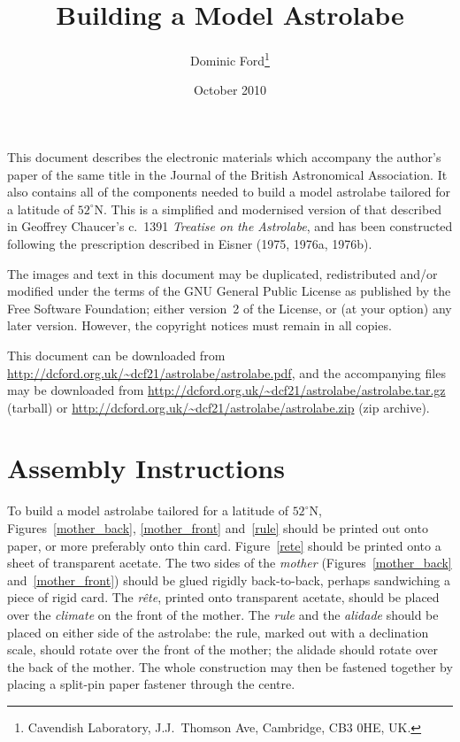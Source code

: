 \documentclass[a4paper,onecolumn,10pt]{article}
\title{Building a Model Astrolabe}
\author{Dominic Ford\footnote{Cavendish Laboratory, J.J.\ Thomson Ave, Cambridge, CB3 0HE, UK.}}
\date{October 2010}
\begin{document}
\maketitle
\setcounter{footnote}{1}

This document describes the electronic materials which accompany the author's
paper of the same title in the Journal of the British Astronomical Association.
It also contains all of the components needed to build a model astrolabe
tailored for a latitude of $52^\circ$N. This is a simplified and modernised
version of that described in Geoffrey Chaucer's c.\ 1391 {\it Treatise on the
Astrolabe}, and has been constructed following the prescription described in
Eisner (1975, 1976a, 1976b).

The images and text in this document may be duplicated, redistributed and/or
modified under the terms of the GNU General Public License as published by the
Free Software Foundation; either version~2 of the License, or (at your option)
any later version. However, the copyright notices must remain in all copies.

This document can be downloaded from
\url{http://dcford.org.uk/~dcf21/astrolabe/astrolabe.pdf}, and the accompanying
files may be downloaded from
\url{http://dcford.org.uk/~dcf21/astrolabe/astrolabe.tar.gz} (tarball) or
\url{http://dcford.org.uk/~dcf21/astrolabe/astrolabe.zip} (zip archive).

\section*{Assembly Instructions}

To build a model astrolabe tailored for a latitude of $52^\circ$N,
Figures~\ref{mother_back}, \ref{mother_front} and~\ref{rule} should be printed
out onto paper, or more preferably onto thin card.  Figure~\ref{rete} should be
printed onto a sheet of transparent acetate.  The two sides of the {\it mother}
(Figures~\ref{mother_back} and~\ref{mother_front}) should be glued rigidly
back-to-back, perhaps sandwiching a piece of rigid card. The {\it r\^ete},
printed onto transparent acetate, should be placed over the {\it climate} on
the front of the mother.  The {\it rule} and the {\it alidade} should be placed
on either side of the astrolabe: the rule, marked out with a declination scale,
should rotate over the front of the mother; the alidade should rotate over the
back of the mother.  The whole construction may then be fastened together by
placing a split-pin paper fastener through the centre.
\end{document}
